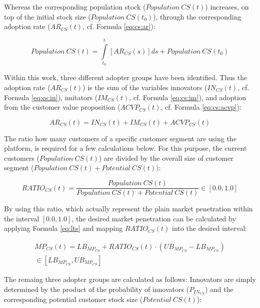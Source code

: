 Whereas the corresponding population stock ($\mathit{Population~CS(t)}$) \linebreak increases, on top of the initial stock size ($\mathit{Population~CS(t_0)}$), through the corresponding adoption rate ($AR_{CS}(t)$, cf. Formula \ref{eq:cs:ar}):

\begin{equation}\label{eq:cs:pop}
	\mathit{Population~CS(t)} = \int\limits_{t_0}^t [AR_{CS}(s)]ds + \mathit{Population~CS(t_0)}
\end{equation}

Within this work, three different adopter groups have been identified. Thus the adoption rate ($AR_{CS}(t)$) is the sum of the variables innovators ($IN_{CS}(t)$, cf. Formula \ref{eq:cs:in}), imitators ($IM_{CS}(t)$, cf. Formula \ref{eq:cs:im}), and adoption from the customer value proposition ($ACVP_{CS}(t)$, cf. Formula \ref{eq:cs:acvp}):

\begin{equation}\label{eq:cs:ar}
		AR_{CS}(t) = IN_{CS}(t) + IM_{CS}(t) + ACVP_{CS}(t)	
\end{equation}

The ratio how many customers of a specific customer segment are using the platform, is required for a few calculations below. For this purpose, the current customers ($\mathit{Population~CS(t)}$) are divided by the overall size of customer segment ($\mathit{Population~CS(t)} + \mathit{Potential~CS(t)})$:

\begin{equation}\label{eq:cs:ratio}
		RATIO_{CS}(t) = \frac{\mathit{Population~CS(t)}}{\mathit{Population~CS(t)} + \mathit{Potential~CS(t)}} \in [0.0,1.0]
\end{equation}

By using this ratio, which actually represent the plain market penetration within the interval $[0.0,1.0]$, the desired market penetration can be calculated by applying Formula \ref{eq:lts} and mapping $RATIO_{CS}(t)$ into the desired interval:

\begin{eqnarray}\label{eq:cs:mp}
	MP_{CS}(t) = LB_{MP_{CS}} + RATIO_{CS}(t) \cdot (UB_{MP_{CS}} - LB_{MP_{CS}})  \nonumber \\ \in [LB_{MP_{CS}},UB_{MP_{CS}}]
\end{eqnarray}

The remaing three adopter groups are calculated as follows: Innovators are simply determined by the product of the probability of innovators ($P_{IN_{CS}}$) and the corresponding potential customer stock size \linebreak ($\mathit{Potential~CS(t)}$):

